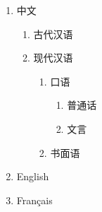 \documentclass[nofonts]{ctexart}
\begin{document}
\begin{enumerate}
	\item 中文
	\begin{enumerate}
		\item 古代汉语
		\item 现代汉语
		\begin{enumerate}
			\item 口语
			\begin{enumerate}
				\item 普通话
				\item 文言
			\end{enumerate}
			\item 书面语
		\end{enumerate}
	\end{enumerate}
	\item English
	\item Fran\c{c}ais
\end{enumerate}
\end{document}
